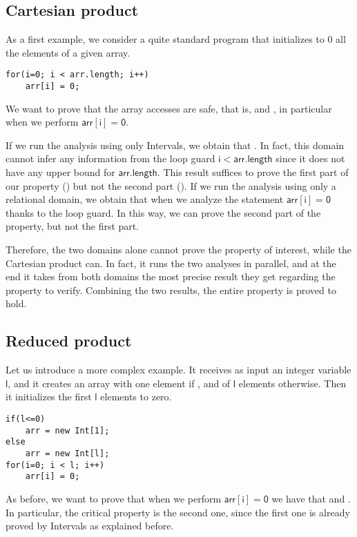 \documentclass[submission,copyright,creativecommons]{eptcs}
\newcommand{\statement}[1]{\ensuremath{\mathsf{#1}}}
\begin{document}
\subsection{Cartesian product}
As a first example, we consider a quite standard program that initializes to 0 all the elements of a given array. 
	\lstset{numbers=none}
\begin{lstlisting}
for(i=0; i < arr.length; i++)
	arr[i] = 0;
\end{lstlisting}

We want to prove that the array accesses are safe, that is,  and , in particular when we perform \statement{arr[i]=0}. 

If we run the analysis using only Intervals, we obtain that . In fact, this domain cannot infer any information from the loop guard \statement{i<arr.length} since it does not have any upper bound for \statement{arr.length}. This result suffices to prove the first part of our property () but not the second part ().
If we run the analysis using only a relational domain, we obtain that  when we analyze the statement \statement{arr[i]=0} thanks to the loop guard. In this way, we can prove the second part of the property, but not the first part.

Therefore, the two domains alone cannot prove the property of interest, while the Cartesian product can. In fact, it runs the two analyses in parallel, and at the end it takes from both domains the most precise result they get regarding the property to verify. Combining the two results, the entire property is proved to hold.

\subsection{Reduced product}
Let us introduce a more complex example. It receives as input an integer variable \statement{l}, and it creates an array with one element if , and of \statement{l} elements otherwise. Then it initializes the first \statement{l} elements to zero.

\begin{lstlisting}
if(l<=0)
	arr = new Int[1];
else 
	arr = new Int[l];
for(i=0; i < l; i++)
	arr[i] = 0;
\end{lstlisting}

As before, we want to prove that when we perform \statement{arr[i]=0} we have that  and . In particular, the critical property is the second one, since the first one is already proved by Intervals as explained before.
\end{document}
